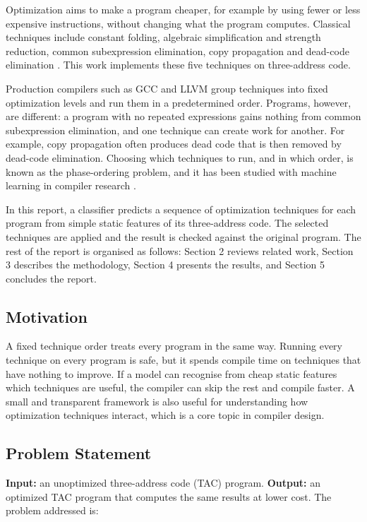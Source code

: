 \documentclass[12pt,a4paper]{article}
\begin{document}
Optimization aims to make a program cheaper, for example by using fewer or less expensive instructions, without changing what the program computes. Classical techniques include constant folding, algebraic simplification and strength reduction, common subexpression elimination, copy propagation and dead-code elimination \cite{muchnick1997}. This work implements these five techniques on three-address code.

Production compilers such as GCC and LLVM group techniques into fixed optimization levels and run them in a predetermined order. Programs, however, are different: a program with no repeated expressions gains nothing from common subexpression elimination, and one technique can create work for another. For example, copy propagation often produces dead code that is then removed by dead-code elimination. Choosing which techniques to run, and in which order, is known as the phase-ordering problem, and it has been studied with machine learning in compiler research \cite{cummins2021,liang2023}.

In this report, a classifier predicts a sequence of optimization techniques for each program from simple static features of its three-address code. The selected techniques are applied and the result is checked against the original program. The rest of the report is organised as follows: Section 2 reviews related work, Section 3 describes the methodology, Section 4 presents the results, and Section 5 concludes the report.

\subsection{Motivation}

A fixed technique order treats every program in the same way. Running every technique on every program is safe, but it spends compile time on techniques that have nothing to improve. If a model can recognise from cheap static features which techniques are useful, the compiler can skip the rest and compile faster. A small and transparent framework is also useful for understanding how optimization techniques interact, which is a core topic in compiler design.

\subsection{Problem Statement}

\textbf{Input:} an unoptimized three-address code (TAC) program.
\textbf{Output:} an optimized TAC program that computes the same results at lower cost.
The problem addressed is:
\end{document}
